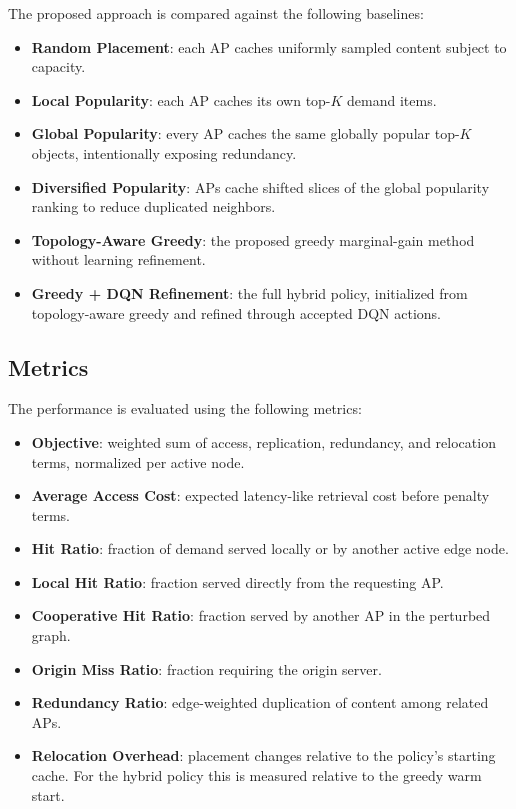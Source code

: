 The proposed approach is compared against the following baselines:
\begin{itemize}
    \item \textbf{Random Placement}: each AP caches uniformly sampled content subject to capacity.
    \item \textbf{Local Popularity}: each AP caches its own top-\(K\) demand items.
    \item \textbf{Global Popularity}: every AP caches the same globally popular top-\(K\) objects, intentionally exposing redundancy.
    \item \textbf{Diversified Popularity}: APs cache shifted slices of the global popularity ranking to reduce duplicated neighbors.
    \item \textbf{Topology-Aware Greedy}: the proposed greedy marginal-gain method without learning refinement.
    \item \textbf{Greedy + DQN Refinement}: the full hybrid policy, initialized from topology-aware greedy and refined through accepted DQN actions.
\end{itemize}

\subsection{Metrics}

The performance is evaluated using the following metrics:
\begin{itemize}
    \item \textbf{Objective}: weighted sum of access, replication, redundancy, and relocation terms, normalized per active node.
    \item \textbf{Average Access Cost}: expected latency-like retrieval cost before penalty terms.
    \item \textbf{Hit Ratio}: fraction of demand served locally or by another active edge node.
    \item \textbf{Local Hit Ratio}: fraction served directly from the requesting AP.
    \item \textbf{Cooperative Hit Ratio}: fraction served by another AP in the perturbed graph.
    \item \textbf{Origin Miss Ratio}: fraction requiring the origin server.
    \item \textbf{Redundancy Ratio}: edge-weighted duplication of content among related APs.
    \item \textbf{Relocation Overhead}: placement changes relative to the policy's starting cache. For the hybrid policy this is measured relative to the greedy warm start.
\end{itemize}

